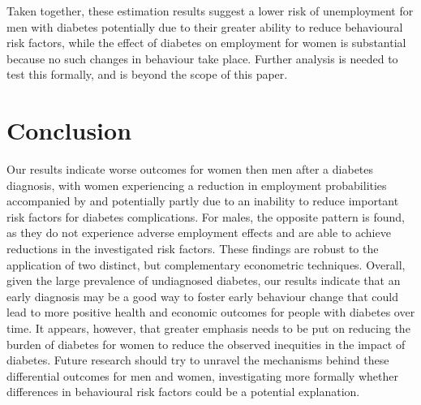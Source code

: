 Taken together, these estimation results suggest a lower risk of unemployment for men with diabetes potentially due to their greater ability to reduce behavioural risk factors, while the effect of diabetes on employment for women is substantial because no such changes in behaviour take place. Further analysis is needed to test this formally, and is beyond the scope of this paper.





\section{Conclusion}

Our results indicate worse outcomes for women then men after a diabetes diagnosis, with women experiencing a reduction in employment probabilities accompanied by and potentially partly due to an inability to reduce important risk factors for diabetes complications. For males, the opposite pattern is found, as they do not experience adverse employment effects and are able to achieve reductions in the investigated risk factors. These findings are robust to the application of two distinct, but complementary econometric techniques. Overall, given the large prevalence of undiagnosed diabetes, our results indicate that an early diagnosis may be a good way to foster early behaviour change that could lead to more positive health and economic outcomes for people with diabetes over time. It appears, however, that greater emphasis needs to be put on reducing the burden of diabetes for women to reduce the observed inequities in the impact of diabetes. Future research should try to unravel the mechanisms behind these differential outcomes for men and women, investigating more formally whether differences in behavioural risk factors could be a potential explanation.

\clearpage
 \newpage 
\acresetall  %
